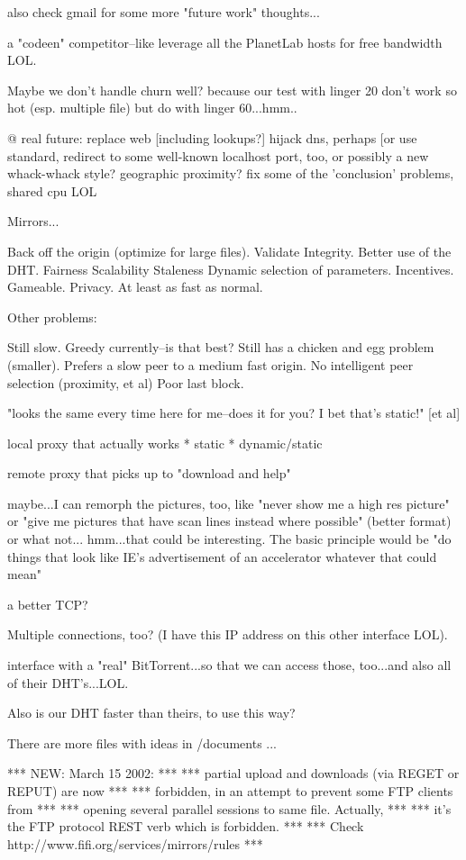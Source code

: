 also check gmail for some more "future work" thoughts...

a "codeen" competitor--like leverage all the PlanetLab hosts for free bandwidth LOL.

Maybe we don't handle churn well? because our test with linger 20 don't work so hot (esp. multiple file) but do with linger 60...hmm..

@ real future: replace web [including lookups?] hijack dns, perhaps [or use standard, redirect to some well-known localhost port, too, or possibly a new whack-whack style? geographic proximity? fix some of the 'conclusion' problems, shared cpu LOL

Mirrors...

Back off the origin (optimize for large files).
Validate Integrity.
Better use of the DHT.
Fairness
Scalability
Staleness
Dynamic selection of parameters.
Incentives.
Gameable.
Privacy.
At least as fast as normal.

Other problems:

Still slow.
Greedy currently--is that best?
Still has a chicken and egg problem (smaller).
Prefers a slow peer to a medium fast origin.
No intelligent peer selection (proximity, et al)
Poor last block.

"looks the same every time here for me--does it for you? I bet that's static!" [et al]

local proxy that actually works
 * static
 * dynamic/static
 
remote proxy that picks up to "download and help"

maybe...I can remorph the pictures, too, like "never show me a high res picture" or "give me pictures that have scan lines instead where possible" (better format) or what not... hmm...that could be interesting.
The basic principle would be "do things that look like IE's advertisement of an accelerator whatever that could mean"


a better TCP?

Multiple connections, too? (I have this IP address on this other interface LOL).

interface with a "real" BitTorrent...so that we can access those, too...and also all of their DHT's...LOL.

Also is our DHT faster than theirs, to use this way?

There are more files with ideas in /documents ...


*** NEW: March 15 2002:                                            ***
***      partial upload and downloads (via REGET or REPUT) are now ***
***      forbidden, in an attempt to prevent some FTP clients from ***
***      opening several parallel sessions to same file. Actually, ***
***      it's the FTP protocol REST verb which is forbidden.       ***
***      Check http://www.fifi.org/services/mirrors/rules          ***
